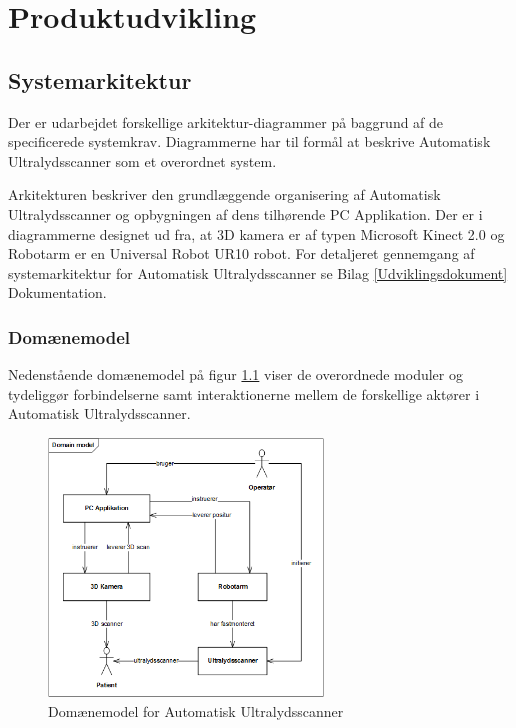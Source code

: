 \chapter{Produktudvikling}\label{Produktudvikling} 

\section{Systemarkitektur}\label{Systemarkitektur}
Der er udarbejdet forskellige arkitektur-diagrammer på baggrund af de specificerede systemkrav. Diagrammerne har til formål at beskrive Automatisk Ultralydsscanner som et overordnet system.

Arkitekturen beskriver den grundlæggende organisering af Automatisk Ultralydsscanner og opbygningen af dens tilhørende PC Applikation. Der er i diagrammerne designet ud fra, at 3D kamera er af typen Microsoft Kinect 2.0 og Robotarm er en Universal Robot UR10 robot. For detaljeret gennemgang af systemarkitektur for Automatisk Ultralydsscanner se Bilag  \ref{Udviklingsdokument} Dokumentation.

\subsection{Domænemodel}
Nedenstående domænemodel på figur \ref{domain} viser de overordnede moduler og tydeliggør forbindelserne samt interaktionerne mellem de forskellige aktører i Automatisk Ultralydsscanner. 

\begin{figure}[H]
    \centering
    \includegraphics[width=0.65\textwidth]{figurer/d/Design/uml_domain}
    \caption{Domænemodel for Automatisk Ultralydsscanner}
    \label{domain}
\end{figure}


